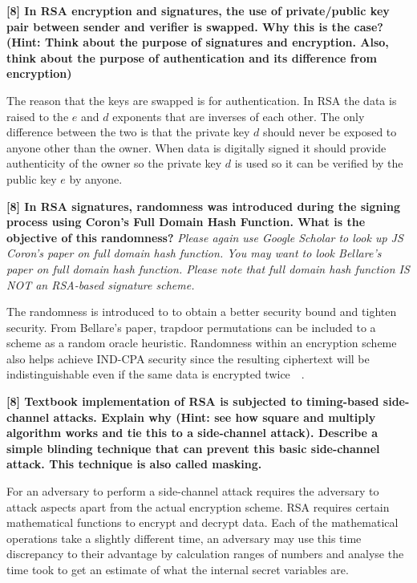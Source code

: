 \documentclass[letterpaper,11pt,notitlepage,fleqn]{article}
\begin{document}
\noindent \textbf{[8]  In  RSA  encryption  and  signatures,  the  use  of  private/public  key  pair  between sender  and  verifier  is  swapped.  Why  this  is  the  case?  (Hint:  Think  about  the purpose  of  signatures  and  encryption.  Also,  think  about  the  purpose  of authentication and its difference from encryption)}

The reason that the keys are swapped is for authentication. In RSA the data is raised to the $e$ and $d$ exponents that are inverses of each other. The only difference between the two is that the private key $d$ should never be exposed to anyone other than the owner. When data is digitally signed it should provide authenticity of the owner so the private key $d$ is used so it can be verified by the public key $e$ by anyone.  

\noindent \textbf{[8]  In  RSA  signatures,  randomness  was  introduced  during  the  signing  process using  Coron’s  Full  Domain  Hash  Function.  What  is  the  objective  of  this randomness?} \textit{Please again use Google Scholar to look up JS Coron’s paper on full domain hash  function. You may want  to  look Bellare’s paper on  full domain hash function.  Please  note  that  full  domain  hash  function  IS  NOT  an  RSA-based signature scheme.}

The randomness is introduced to to obtain a better security bound and tighten security. From Bellare's paper, trapdoor permutations can be included to a scheme as a random oracle heuristic. Randomness within an encryption scheme also helps achieve IND-CPA security since the resulting ciphertext will be indistinguishable even if the same data is encrypted twice~\cite{Hohen}~\cite{Coron}. 


\noindent \textbf{[8]  Textbook  implementation  of  RSA    is  subjected  to  timing-based  side-channel attacks. Explain why  (Hint:  see how  square  and multiply  algorithm works  and  tie this  to  a  side-channel  attack).  Describe  a  simple  blinding  technique  that  can prevent this basic side-channel attack. This technique is also called masking.}

For an adversary to perform a side-channel attack requires the adversary to attack aspects apart from the actual encryption scheme. RSA requires certain mathematical functions to encrypt and decrypt data. Each of the mathematical operations take a slightly different time, an adversary may use this time discrepancy to their advantage by calculation ranges of numbers and analyse the time took to get an estimate of what the internal secret variables are. 
\end{document}
